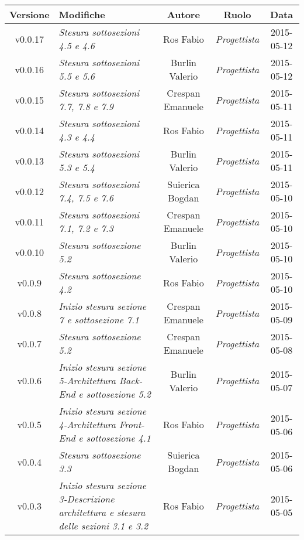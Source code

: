 \begin{table}[h]
\centering
\begin{tabular}{|c|p{}|c|c|c|}
	\toprule
	\textbf{Versione} & \textbf{Modifiche} & \textbf{Autore} & \textbf{Ruolo} & \textbf{Data} \\
	\midrule
	\midrule
		v0.0.17 & \textit{Stesura sottosezioni 4.5 e 4.6} & Ros Fabio & \textit{Progettista} & 2015-05-12\\
	\midrule
		v0.0.16 & \textit{Stesura sottosezioni 5.5 e 5.6} & Burlin Valerio & \textit{Progettista} & 2015-05-12\\
	\midrule
		v0.0.15 & \textit{Stesura sottosezioni 7.7, 7.8 e 7.9} & Crespan Emanuele & \textit{Progettista} & 2015-05-11\\
	\midrule
		v0.0.14 & \textit{Stesura sottosezioni 4.3 e 4.4} & Ros Fabio & \textit{Progettista} & 2015-05-11\\
	\midrule
		v0.0.13 & \textit{Stesura sottosezioni 5.3 e 5.4} & Burlin Valerio & \textit{Progettista} & 2015-05-11\\
	\midrule
		v0.0.12 & \textit{Stesura sottosezioni 7.4, 7.5 e 7.6} & Suierica Bogdan & \textit{Progettista} & 2015-05-10\\
	\midrule
		v0.0.11 & \textit{Stesura sottosezioni 7.1, 7.2 e 7.3} & Crespan Emanuele & \textit{Progettista} & 2015-05-10\\
	\midrule
		v0.0.10 & \textit{Stesura sottosezione 5.2} & Burlin Valerio & \textit{Progettista} & 2015-05-10\\
	\midrule
		v0.0.9 & \textit{Stesura sottosezione 4.2} & Ros Fabio & \textit{Progettista} & 2015-05-10\\
	\midrule
		v0.0.8 & \textit{Inizio stesura sezione 7 e sottosezione 7.1} & Crespan Emanuele & \textit{Progettista} & 2015-05-09\\
	\midrule
		v0.0.7 & \textit{Stesura sottosezione 5.2} & Crespan Emanuele & \textit{Progettista} & 2015-05-08\\
	\midrule
		v0.0.6 & \textit{Inizio stesura sezione 5-Architettura Back-End e sottosezione 5.2} & Burlin Valerio & \textit{Progettista} & 2015-05-07\\
	\midrule
		v0.0.5 & \textit{Inizio stesura sezione 4-Architettura Front-End e sottosezione 4.1} & Ros Fabio & \textit{Progettista} & 2015-05-06\\
	\midrule
		v0.0.4 & \textit{Stesura sottosezione 3.3} & Suierica Bogdan & \textit{Progettista} & 2015-05-06\\
	\midrule
		v0.0.3 & \textit{Inizio stesura sezione 3-Descrizione architettura e stesura delle sezioni 3.1 e 3.2} & Ros Fabio & \textit{Progettista} & 2015-05-05\\
	\bottomrule
\end{tabular}
\end{table}

